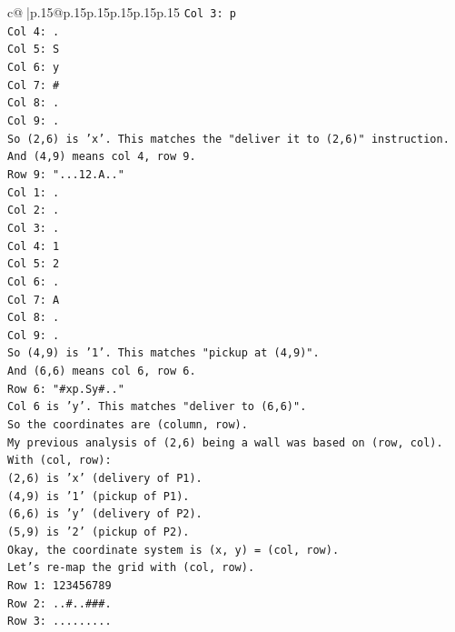\documentclass{article}
\begin{document}
{\begin{supertabular}{c@{$\;$}|p{.15\linewidth}@{}p{.15\linewidth}p{.15\linewidth}p{.15\linewidth}p{.15\linewidth}p{.15\linewidth}}
{{{\texttt{Col 3: p} \\
\texttt{Col 4: .} \\
\texttt{Col 5: S} \\
\texttt{Col 6: y} \\
\texttt{Col 7: \#} \\
\texttt{Col 8: .} \\
\texttt{Col 9: .} \\
\texttt{So (2,6) is 'x'. This matches the "deliver it to (2,6)" instruction.} \\
\texttt{And (4,9) means col 4, row 9.} \\
\texttt{Row 9: "...12.A.."} \\
\texttt{Col 1: .} \\
\texttt{Col 2: .} \\
\texttt{Col 3: .} \\
\texttt{Col 4: 1} \\
\texttt{Col 5: 2} \\
\texttt{Col 6: .} \\
\texttt{Col 7: A} \\
\texttt{Col 8: .} \\
\texttt{Col 9: .} \\
\texttt{So (4,9) is '1'. This matches "pickup at (4,9)".} \\
\texttt{And (6,6) means col 6, row 6.} \\
\texttt{Row 6: "\#xp.Sy\#.."} \\
\texttt{Col 6 is 'y'. This matches "deliver to (6,6)".} \\
\texttt{So the coordinates are (column, row).} \\
\texttt{My previous analysis of (2,6) being a wall was based on (row, col).} \\
\texttt{With (col, row):} \\
\texttt{(2,6) is 'x' (delivery of P1).} \\
\texttt{(4,9) is '1' (pickup of P1).} \\
\texttt{(6,6) is 'y' (delivery of P2).} \\
\texttt{(5,9) is '2' (pickup of P2).} \\
\texttt{Okay, the coordinate system is (x, y) = (col, row).} \\
\texttt{Let's re{-}map the grid with (col, row).} \\
\texttt{Row 1: 123456789} \\
\texttt{Row 2: ..\#..\#\#\#.} \\
\texttt{Row 3: .........} \\
}}}
\end{supertabular}}
\end{document}
